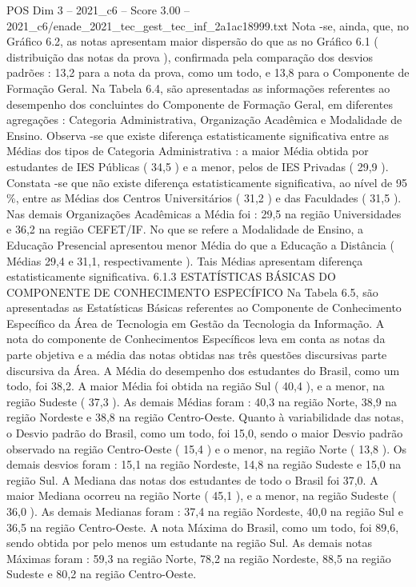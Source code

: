 \begin{textsample}{POS Dim 3 – 2021\_c6 – Score 3.00 – 2021\_c6/enade\_2021\_tec\_gest\_tec\_inf\_2a1ac18999.txt}
Nota -se, ainda, que, no Gráfico 6.2, as notas apresentam maior dispersão do que as no Gráfico 6.1 ( distribuição das notas da prova ), confirmada pela comparação dos desvios padrões : 13,2 para a nota da prova, como um todo, e 13,8 para o Componente de Formação Geral.
Na Tabela 6.4, são apresentadas as informações referentes ao desempenho dos concluintes do Componente de Formação Geral, em diferentes agregações : Categoria Administrativa, Organização Acadêmica e Modalidade de Ensino.
Observa -se que existe diferença estatisticamente significativa entre as Médias dos tipos de Categoria Administrativa : a maior Média obtida por estudantes de IES Públicas ( 34,5 ) e a menor, pelos de IES Privadas ( 29,9 ).
Constata -se que não existe diferença estatisticamente significativa, ao nível de 95 \%, entre as Médias dos Centros Universitários ( 31,2 ) e das Faculdades ( 31,5 ).
Nas demais Organizações Acadêmicas a Média foi : 29,5 na região Universidades e 36,2 na região CEFET/IF.
No que se refere a Modalidade de Ensino, a Educação Presencial apresentou menor Média do que a Educação a Distância ( Médias 29,4 e 31,1, respectivamente ).
Tais Médias apresentam diferença estatisticamente significativa. 6.1.3 ESTATÍSTICAS BÁSICAS DO COMPONENTE DE CONHECIMENTO ESPECÍFICO Na Tabela 6.5, são apresentadas as Estatísticas Básicas referentes ao Componente de Conhecimento Específico da Área de Tecnologia em Gestão da Tecnologia da Informação.
A nota do componente de Conhecimentos Específicos leva em conta as notas da parte objetiva e a média das notas obtidas nas três questões discursivas parte discursiva da Área.
A Média do desempenho dos estudantes do Brasil, como um todo, foi 38,2.
A maior Média foi obtida na região Sul ( 40,4 ), e a menor, na região Sudeste ( 37,3 ).
As demais Médias foram : 40,3 na região Norte, 38,9 na região Nordeste e 38,8 na região Centro-Oeste.
Quanto à variabilidade das notas, o Desvio padrão do Brasil, como um todo, foi 15,0, sendo o maior Desvio padrão observado na região Centro-Oeste ( 15,4 ) e o menor, na região Norte ( 13,8 ).
Os demais desvios foram : 15,1 na região Nordeste, 14,8 na região Sudeste e 15,0 na região Sul.
A Mediana das notas dos estudantes de todo o Brasil foi 37,0.
A maior Mediana ocorreu na região Norte ( 45,1 ), e a menor, na região Sudeste ( 36,0 ).
As demais Medianas foram : 37,4 na região Nordeste, 40,0 na região Sul e 36,5 na região Centro-Oeste.
A nota Máxima do Brasil, como um todo, foi 89,6, sendo obtida por pelo menos um estudante na região Sul.
As demais notas Máximas foram : 59,3 na região Norte, 78,2 na região Nordeste, 88,5 na região Sudeste e 80,2 na região Centro-Oeste.

\end{textsample}

